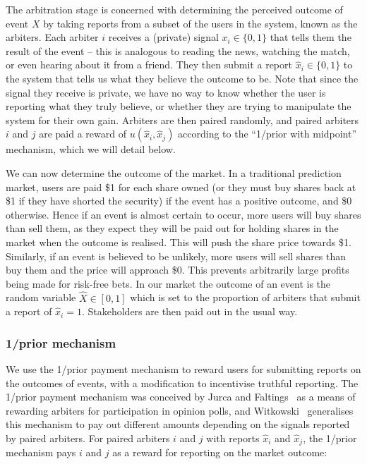 The arbitration stage is concerned with determining the perceived outcome of
event $X$ by taking reports from a subset of the users in the system, known as
the arbiters. Each arbiter $i$ receives a (private) signal $x_i \in \{0,1\}$
that tells them the result of the event -- this is analogous to reading the
news, watching the match, or even hearing about it from a friend. They then
submit a report $\hat{x}_i \in \{0,1\}$ to the system that tells us what they
believe the outcome to be. Note that since the signal they receive is private,
we have no way to know whether the user is reporting what they truly believe,
or whether they are trying to manipulate the system for their own gain.
Arbiters are then paired randomly, and paired arbiters $i$ and $j$ are paid a
reward of $u(\hat{x}_i, \hat{x}_j)$ according to the ``1/prior with midpoint''
mechanism, which we will detail below.

We can now determine the outcome of the market. In a traditional prediction
market, users are paid \$1 for each share owned (or they must buy shares back
at \$1 if they have shorted the security) if the event has a positive outcome,
and \$0 otherwise. Hence if an event is almost certain to occur, more users
will buy shares than sell them, as they expect they will be paid out for
holding shares in the market when the outcome is realised. This will push the
share price towards \$1. Similarly, if an event is believed to be unlikely,
more users will sell shares than buy them and the price will approach \$0. This
prevents arbitrarily large profits being made for risk-free bets. In our market
the outcome of an event is the random variable $\hat{X} \in [0,1]$ which is set
to the proportion of arbiters that submit a report of $\hat{x}_i=1$.
Stakeholders are then paid out in the usual way.

\subsubsection{1/prior mechanism}

\label{sec:oneOverPrior}

We use the 1/prior payment mechanism to reward users for submitting reports on
the outcomes of events, with a modification to incentivise truthful reporting.
The 1/prior payment mechanism was conceived by Jurca and
Faltings~\cite{JurcaFaltings2008, JurcaFaltings2011} as a means of rewarding
arbiters for participation in opinion polls, and Witkowski~\cite{Witkowski2014}
generalises this mechanism to pay out different amounts depending on the
signals reported by paired arbiters. For paired arbiters $i$ and $j$ with
reports $\hat{x}_i$ and $\hat{x}_j$, the 1/prior mechanism pays $i$ and $j$ as
a reward for reporting on the market outcome:

